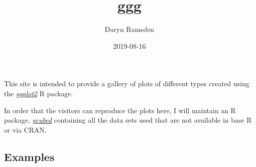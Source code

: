 \documentclass[]{book}
\title{ggg}
\author{Daryn Ramsden}
\date{2019-08-16}
\begin{document}
\maketitle

{
\setcounter{tocdepth}{1}
\tableofcontents
}
\hypertarget{Intro}{%
\chapter*{}\label{Intro}}

This site is intended to provide a gallery of plots of different types created using the \protect\hyperlink{ggplot}{\emph{ggplot2}} R package.

In order that the visitors can reproduce the plots here, I will maintain an R package, \protect\hyperlink{gcubed}{\emph{gcubed}} containing all the data sets used that are not available in base R or via CRAN.

\hypertarget{examples}{%
\section*{\texorpdfstring{\textbf{Examples}}{Examples}}\label{examples}}

\leavevmode\hypertarget{unemp1tn}{}%

\leavevmode\hypertarget{unemp2tn}{}%

\leavevmode\hypertarget{unemp3tn}{}%

\leavevmode\hypertarget{unemp4tn}{}%

\leavevmode\hypertarget{appletn}{}%

\leavevmode\hypertarget{budgettn}{}%

\leavevmode\hypertarget{atptn}{}%

\leavevmode\hypertarget{wtatn}{}%

\leavevmode\hypertarget{sptn}{}%

\leavevmode\hypertarget{sptn}{}%

\leavevmode\hypertarget{tfwrtn}{}%

\leavevmode\hypertarget{lifeexcountriestn}{}%

\leavevmode\hypertarget{metsbartn}{}%

\leavevmode\hypertarget{nleastbarstn}{}%

\leavevmode\hypertarget{nleastgamesabovetn}{}%

\leavevmode\hypertarget{chihisttn}{}%

\leavevmode\hypertarget{chicomphisttn}{}%
\end{document}
